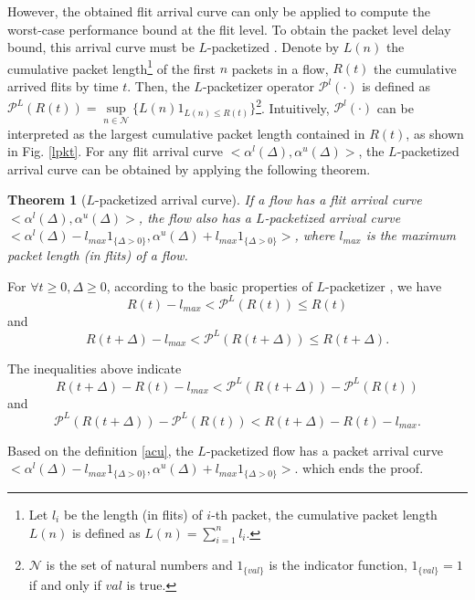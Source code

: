 \documentclass[10pt,journal]{IEEEtran}
\newtheorem{theorem}{Theorem}
\begin{document}
However, the obtained flit arrival curve can only be applied to compute the worst-case performance bound at the flit level. To obtain the packet level delay bound, this arrival curve must be $L$-packetized \cite{Boudec2001Network}. Denote by $L(n)$ the cumulative packet length\footnote{Let $l_i$ be the length (in flits) of $i$-th packet, the cumulative packet length $L(n)$ is defined as $L(n)=\sum_{i=1}^n l_i$.} of the first $n$ packets in a flow, $R(t)$ the cumulative arrived flits by time $t$. Then, the $L$-packetizer operator $\mathcal{P}^l(\cdot)$ is defined as $\mathcal{P}^L(R(t))=\underset{n\in\mathcal{N}}{\sup}\{L(n)1_{L(n)\leq R(t)}\}$\footnote{$\mathcal{N}$ is the set of natural numbers and $1_{\{val\}}$ is the indicator function, $1_{\{val\}}=1$ if and only if $val$ is true.}. Intuitively, $\mathcal{P}^l(\cdot)$ can be interpreted as the largest cumulative packet length contained in $R(t)$, as shown in Fig. \ref{lpkt}. For any flit arrival curve $<\alpha^l(\Delta),\alpha^u(\Delta)>$, the $L$-packetized arrival curve can be obtained by applying the following theorem.
\begin{theorem}[$L$-packetized arrival curve]\label{pktac}
If a flow has a flit arrival curve $<\alpha^l(\Delta),\alpha^u(\Delta)>$, the flow also has a $L$-packetized arrival curve $<\alpha^l(\Delta)-l_{max}1_{\{\Delta>0\}},\alpha^u(\Delta)+l_{max}1_{\{\Delta>0\}}>$, where $l_{max}$ is the maximum packet length (in flits) of a flow.
\end{theorem}
\begin{IEEEproof}
For $\forall t\geq 0,\Delta\geq 0$, according to the basic properties of $L$-packetizer \cite{Boudec2001Network}, we have
$$R(t)-l_{max}< \mathcal{P}^L(R(t))\leq R(t)$$
and
$$R(t+\Delta)-l_{max}< \mathcal{P}^L(R(t+\Delta))\leq R(t+\Delta).$$

The inequalities above indicate
$$R(t+\Delta)-R(t)-l_{max}< \mathcal{P}^L(R(t+\Delta))-\mathcal{P}^L(R(t))$$
and
$$\mathcal{P}^L(R(t+\Delta))-\mathcal{P}^L(R(t))< R(t+\Delta)-R(t)-l_{max}.$$

Based on the definition \ref{acu}, the $L$-packetized flow has a packet arrival curve $<\alpha^l(\Delta)-l_{max}1_{\{\Delta>0\}},\alpha^u(\Delta)+l_{max}1_{\{\Delta>0\}}>$.
which ends the proof.
\end{IEEEproof}
\end{document}
